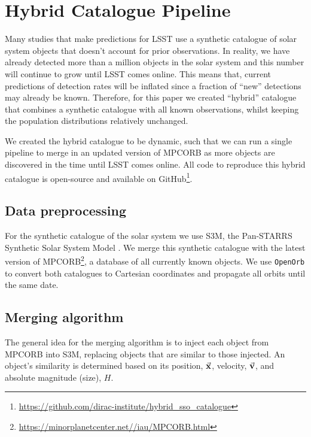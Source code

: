 \documentclass[twocolumn]{aastex631}
\newcommand{\sss}{S3M}
\newcommand{\mpco}{MPCORB}
\begin{document}

{}

\restartappendixnumbering

\allowdisplaybreaks
\appendix

\section{Hybrid Catalogue Pipeline}\label{app:hybrid}
Many studies that make predictions for LSST use a synthetic catalogue of solar system objects that doesn't account for prior observations. In reality, we have already detected more than a million objects in the solar system and this number will continue to grow until LSST comes online. This means that, current predictions of detection rates will be inflated since a fraction of ``new'' detections may already be known. Therefore, for this paper we created ``hybrid'' catalogue that combines a synthetic catalogue with all known observations, whilst keeping the population distributions relatively unchanged.

We created the hybrid catalogue to be dynamic, such that we can run a single pipeline to merge in an updated version of \mpco{} as more objects are discovered in the time until LSST comes online. All code to reproduce this hybrid catalogue is open-source and available on GitHub\footnote{\url{https://github.com/dirac-institute/hybrid_sso_catalogue}}.

\subsection{Data preprocessing}
For the synthetic catalogue of the solar system we use \sss{}, the Pan-STARRS Synthetic Solar System Model \citep[\sss{}][]{Grav+2011}. We merge this synthetic catalogue with the latest version of \mpco{}\footnote{\url{https://minorplanetcenter.net//iau/MPCORB.html}}, a database of all currently known objects. We use \texttt{OpenOrb} \citep{Granvik+2009} to convert both catalogues to Cartesian coordinates and propagate all orbits until the same date.

\subsection{Merging algorithm}
The general idea for the merging algorithm is to inject each object from \mpco{} into \sss{}, replacing objects that are similar to those injected. An object's similarity is determined based on its position, $\va{x}$, velocity, $\va{v}$, and absolute magnitude (size), ${H}$.
\end{document}
